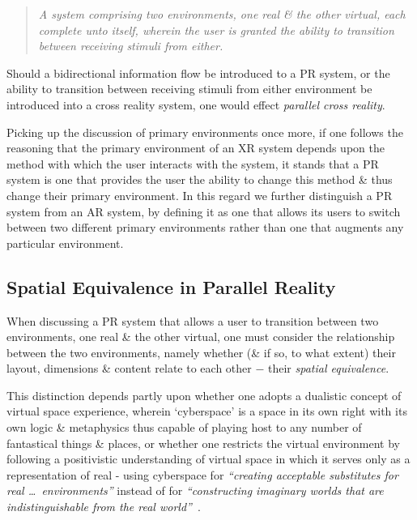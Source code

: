 \begin{quote}
	\textit{A system comprising two environments, one real \& the other virtual, each complete unto itself, wherein the user is granted the ability to transition between receiving stimuli from either.}
\end{quote}

Should a bidirectional information flow be introduced to a PR system, or the ability to transition between receiving stimuli from either environment be introduced into a cross reality system, one would effect \textit{parallel cross reality}.

Picking up the discussion of primary environments once more, if one follows the reasoning that the primary environment of an XR system depends upon the method with which the user interacts with the system, it stands that a PR system is one that provides the user the ability to change this method \& thus change their primary environment. In this regard we further distinguish a PR system from an AR system, by defining it as one that allows its users to switch between two different primary environments rather than one that augments any particular environment.


\subsection{Spatial Equivalence in Parallel Reality}

\newcommand{\turklevrfootnote}{\footnote{\textit{``For virtual reality to be interesting it has to emulate the real. But you have to be able to do something in the virtual that you couldn't in the real.''}~\cite{Turkle1997}}}

When discussing a PR system that allows a user to transition between two environments, one real \& the other virtual, one must consider the relationship between the two environments, namely whether (\& if so, to what extent) their layout, dimensions \& content relate to each other $-$ their \textit{spatial equivalence}.

This distinction depends partly upon whether one adopts a dualistic concept of virtual space experience, wherein `cyberspace' is a space in its own right with its own logic \& metaphysics thus capable of playing host to any number of fantastical things \& places, or whether one restricts the virtual environment by following a positivistic understanding of virtual space in which it serves only as a representation of real - using cyberspace for \textit{``creating acceptable substitutes for real \ldots\ environments''} instead of for \textit{``constructing imaginary worlds that are indistinguishable from the real world''}~\cite{Qvortrup2002}.

